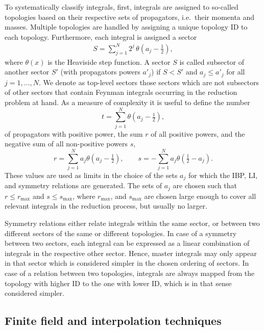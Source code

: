 \documentclass[11pt,a4paper,DIV=11,numbers=noenddot,parskip=half]{scrartcl}
\begin{document}
To systematically classify integrals, first, integrals are assigned to so-called topologies based on their respective sets of propagators, i.e.\ their momenta and masses.
Multiple topologies are handled by assigning a unique topology ID to each topology.
Furthermore, each integral is assigned a sector
%
\begin{align}
  S = \sum\limits_{j=1}^N 2^j\,\theta(a_j - \tfrac{1}{2}),
  \label{eq:sector-number}
\end{align}
%
where $\theta(x)$ is the Heaviside step function.
A sector $S$ is called subsector of another sector $S'$ (with propagators powers $a'_j$) if $S<S'$ and $a_j\le a'_j$ for all $j=1,\dots,N$.
We denote as top-level sectors those sectors which are not subsectors of other sectors that contain Feynman integrals occurring in the reduction problem at hand.
As a measure of complexity it is useful to define the number
%
\begin{equation}
  t = \sum_{j=1}^N \theta(a_j - \tfrac{1}{2}),
  \label{eq:t-definition}
\end{equation}
%
of propagators with positive power, the sum $r$ of all positive powers, and the negative sum of all non-positive powers $s$,
%
\begin{equation}
  r = \sum_{j=1}^N a_j \theta(a_j - \tfrac{1}{2}),\qquad
  s = -\sum_{j=1}^N a_j\theta(\tfrac{1}{2} - a_j).
  \label{eq:rs-value}
\end{equation}
%
These values are used as limits in the choice of the sets $a_j$ for which the IBP, LI, and symmetry relations are generated.
The sets of $a_j$ are chosen such that $r\le r_{\max}$ and $s\le s_{\max}$, where $r_{\max}$, and $s_{\max}$ are chosen large enough to cover all relevant integrals in the reduction process, but usually no larger.

Symmetry relations either relate integrals within the same sector, or between two different sectors of the same or different topologies.
In case of a symmetry between two sectors, each integral can be expressed as a linear combination of integrals in the respective other sector.
Hence, master integrals may only appear in that sector which is considered simpler in the chosen ordering of sectors.
In case of a relation between two topologies, integrals are always mapped from the topology with higher ID to the one with lower ID, which is in that sense considered simpler.


\subsection{Finite field and interpolation techniques}
\label{sect:interpolation}
\end{document}
